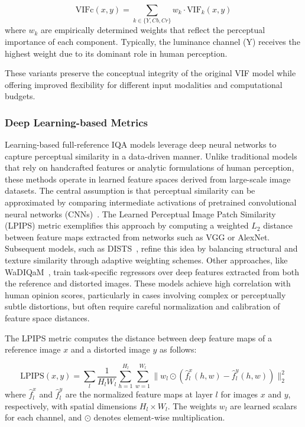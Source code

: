 \begin{equation}
\text{VIFc}(x, y) = \sum_{k \in \{Y,Cb,Cr\}} w_k \cdot \text{VIF}_k(x, y)
\end{equation}
where $w_k$ are empirically determined weights that reflect the perceptual importance of each component. Typically, the luminance channel (Y) receives the highest weight due to its dominant role in human perception.

These variants preserve the conceptual integrity of the original VIF model while offering improved flexibility for different input modalities and computational budgets.

\subsubsection{Deep Learning-based Metrics}\label{sec:deep_learning_based_metrics}

Learning-based full-reference IQA models leverage deep neural networks to capture perceptual similarity in a data-driven manner. Unlike traditional models that rely on handcrafted features or analytic formulations of human perception, these methods operate in learned feature spaces derived from large-scale image datasets. The central assumption is that perceptual similarity can be approximated by comparing intermediate activations of pretrained convolutional neural networks (CNNs)~\cite{Zhang2018LPIPS}. The Learned Perceptual Image Patch Similarity (LPIPS) metric exemplifies this approach by computing a weighted $L_2$ distance between feature maps extracted from networks such as VGG or AlexNet. Subsequent models, such as DISTS~\cite{ding2020dists}, refine this idea by balancing structural and texture similarity through adaptive weighting schemes. Other approaches, like WaDIQaM~\cite{Bosse2018WaDIQaM}, train task-specific regressors over deep features extracted from both the reference and distorted images. These models achieve high correlation with human opinion scores, particularly in cases involving complex or perceptually subtle distortions, but often require careful normalization and calibration of feature space distances.

The LPIPS metric computes the distance between deep feature maps of a reference image $x$ and a distorted image $y$ as follows:

\begin{equation}
\text{LPIPS}(x, y) = \sum_{l} \frac{1}{H_l W_l} \sum_{h=1}^{H_l} \sum_{w=1}^{W_l} \| w_l \odot (\hat{f}_l^x(h, w) - \hat{f}_l^y(h, w)) \|_2^2
\end{equation}
where $\hat{f}_l^x$ and $\hat{f}_l^y$ are the normalized feature maps at layer $l$ for images $x$ and $y$, respectively, with spatial dimensions $H_l \times W_l$. The weights $w_l$ are learned scalars for each channel, and $\odot$ denotes element-wise multiplication.

